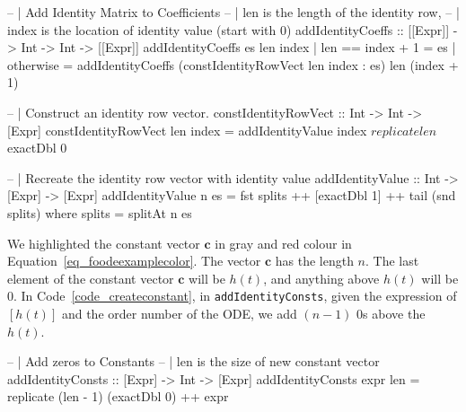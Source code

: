 \begin{listing}
\begin{haskell1}
-- | Add Identity Matrix to Coefficients
-- | len is the length of the identity row,
-- | index is the location of identity value (start with 0)
addIdentityCoeffs :: [[Expr]] -> Int -> Int -> [[Expr]]
addIdentityCoeffs es len index
  | len == index + 1 = es
  | otherwise = addIdentityCoeffs (constIdentityRowVect len index : es) len (index + 1)

-- | Construct an identity row vector.
constIdentityRowVect :: Int -> Int -> [Expr]
constIdentityRowVect len index = addIdentityValue index $ replicate len $ exactDbl 0

-- | Recreate the identity row vector with identity value 
addIdentityValue :: Int -> [Expr] -> [Expr]
addIdentityValue n es = fst splits ++ [exactDbl 1] ++ tail (snd splits)
  where splits = splitAt n es
\end{haskell1}
\label{code_createidentity}
\end{listing}

We highlighted the constant vector $\boldsymbol{c}$ in gray and red colour in Equation~\ref{eq_foodeexamplecolor}. The vector $\boldsymbol{c}$ has the length $n$. The last element of the constant vector $\boldsymbol{c}$ will be $h(t)$, and anything above $h(t)$ will be 0. In Code~\ref{code_createconstant}, in \verb|addIdentityConsts|, given the expression of $[h(t)]$ and the order number of the ODE, we add $(n-1)$ 0s above the $h(t)$. 

\begin{listing}
\begin{haskell1}
-- | Add zeros to Constants
-- | len is the size of new constant vector
addIdentityConsts :: [Expr] -> Int -> [Expr]
addIdentityConsts expr len = replicate (len - 1) (exactDbl 0) ++ expr
\end{haskell1}
\label{code_createconstant}
\end{listing}

